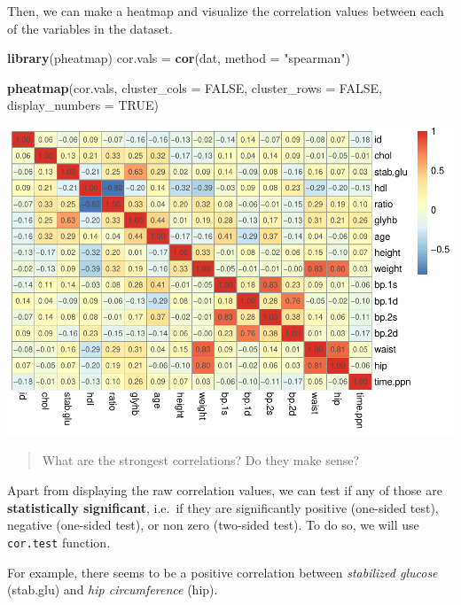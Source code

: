 \documentclass[
]{book}
\newenvironment{Shaded}{\begin{snugshade}}{\end{snugshade}}
\newcommand{\AttributeTok}[1]{\textcolor[rgb]{0.13,0.29,0.53}{#1}}
\newcommand{\ConstantTok}[1]{\textcolor[rgb]{0.56,0.35,0.01}{#1}}
\newcommand{\DocumentationTok}[1]{\textcolor[rgb]{0.56,0.35,0.01}{\textbf{\textit{#1}}}}
\newcommand{\FunctionTok}[1]{\textcolor[rgb]{0.13,0.29,0.53}{\textbf{#1}}}
\newcommand{\NormalTok}[1]{#1}
\newcommand{\OtherTok}[1]{\textcolor[rgb]{0.56,0.35,0.01}{#1}}
\newcommand{\SpecialCharTok}[1]{\textcolor[rgb]{0.81,0.36,0.00}{\textbf{#1}}}
\newcommand{\StringTok}[1]{\textcolor[rgb]{0.31,0.60,0.02}{#1}}
\begin{document}
Then, we can make a heatmap and visualize the correlation values between each of the variables in the dataset.

\begin{Shaded}
\begin{Highlighting}[]
\FunctionTok{library}\NormalTok{(pheatmap)}
\NormalTok{cor.vals }\OtherTok{=} \FunctionTok{cor}\NormalTok{(dat, }\AttributeTok{method =} \StringTok{"spearman"}\NormalTok{)}

\FunctionTok{pheatmap}\NormalTok{(cor.vals,}
         \AttributeTok{cluster\_cols =} \ConstantTok{FALSE}\NormalTok{,}
         \AttributeTok{cluster\_rows =} \ConstantTok{FALSE}\NormalTok{,}
         \AttributeTok{display\_numbers =} \ConstantTok{TRUE}\NormalTok{)}
\end{Highlighting}
\end{Shaded}

\includegraphics{_main_files/figure-latex/unnamed-chunk-151-1.pdf}

\begin{quote}
What are the strongest correlations? Do they make sense?
\end{quote}

Apart from displaying the raw correlation values, we can test if any of those are \textbf{statistically significant}, i.e.~if they are significantly positive (one-sided test), negative (one-sided test), or non zero (two-sided test). To do so, we will use \texttt{cor.test} function.

For example, there seems to be a positive correlation between \emph{stabilized glucose} (stab.glu) and \emph{hip circumference} (hip).

\begin{Shaded}
\end{Shaded}
\end{document}
